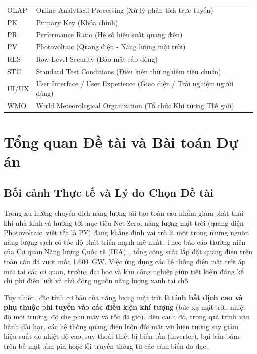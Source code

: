 \documentclass[12pt, a4paper]{report}
\begin{document}
\begin{tabularx}{\textwidth}{@{} l X @{}}
    OLAP      & Online Analytical Processing (Xử lý phân tích trực tuyến) \\
    PK        & Primary Key (Khóa chính) \\
    PR        & Performance Ratio (Hệ số hiệu suất quang điện) \\
    PV        & Photovoltaic (Quang điện - Năng lượng mặt trời) \\
    RLS       & Row-Level Security (Bảo mật cấp dòng) \\
    STC       & Standard Test Conditions (Điều kiện thử nghiệm tiêu chuẩn) \\
    UI/UX     & User Interface / User Experience (Giao diện / Trải nghiệm người dùng) \\
    WMO       & World Meteorological Organization (Tổ chức Khí tượng Thế giới) \\
    \bottomrule
    \end{tabularx}

\newpage
\pagestyle{main}

\chapter{Tổng quan Đề tài và Bài toán Dự án}
\label{chap:tongquan}

\section{Bối cảnh Thực tế và Lý do Chọn Đề tài}
\label{sec:lydo}

Trong xu hướng chuyển dịch năng lượng tái tạo toàn cầu nhằm giảm phát thải khí nhà kính và hướng tới mục tiêu Net Zero, năng lượng mặt trời (quang điện -- Photovoltaic, viết tắt là PV) đang khẳng định vai trò là một trong những nguồn năng lượng sạch có tốc độ phát triển mạnh mẽ nhất. Theo báo cáo thường niên của Cơ quan Năng lượng Quốc tế (IEA)~\cite{iea2023pvps}, tổng công suất lắp đặt quang điện trên toàn cầu đã vượt mốc 1.600~GW. Việc ứng dụng các hệ thống điện mặt trời áp mái tại các cơ quan, trường đại học và khu công nghiệp giúp tiết kiệm đáng kể chi phí điện lưới và chủ động nguồn năng lượng xanh tại chỗ.

Tuy nhiên, đặc tính cơ bản của năng lượng mặt trời là \textbf{tính bất định cao và phụ thuộc phi tuyến vào các điều kiện khí tượng} (bức xạ mặt trời, nhiệt độ môi trường, độ che phủ mây và tốc độ gió). Bên cạnh đó, trong quá trình vận hành dài hạn, các hệ thống quang điện luôn đối mặt với hiện tượng suy giảm hiệu suất do nhiệt độ cao, suy thoái thiết bị biến tần (Inverter), bụi bẩn bám trên bề mặt tấm pin hoặc lỗi truyền thông từ các cảm biến đo đạc.
\end{document}

